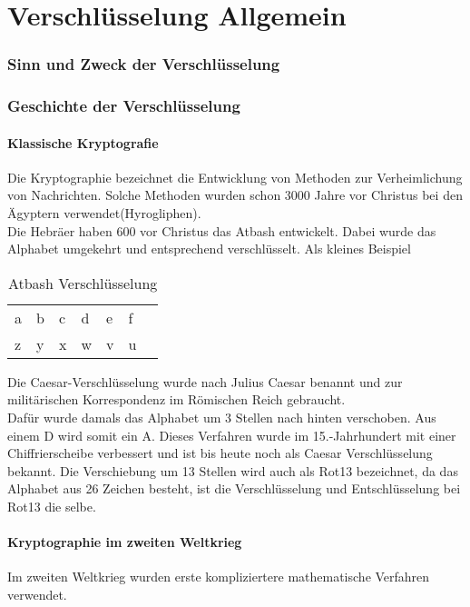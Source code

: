 \part{Verschlüsselung Allgemein}
\section{Sinn und Zweck der Verschlüsselung}


\section{Geschichte der Verschlüsselung}
\subsection{Klassische Kryptografie}
Die Kryptographie bezeichnet die Entwicklung von Methoden zur Verheimlichung von Nachrichten.
Solche Methoden wurden schon 3000 Jahre vor Christus bei den Ägyptern verwendet(Hyrogliphen). \\
Die Hebräer haben 600 vor Christus das Atbash entwickelt. Dabei wurde das Alphabet umgekehrt und entsprechend verschlüsselt.
Als kleines Beispiel

\begin{table}[ht]
\caption{Atbash Verschlüsselung}
\begin{center}
\begin{tabular}{|l|l|l|l|l|l|l|}
  a & b & c & d & e & f\\
  z & y & x & w & v & u\\
\end{tabular}
\end{center}
\end{table}


Die Caesar-Verschlüsselung wurde nach Julius Caesar benannt und zur militärischen Korrespondenz im Römischen Reich gebraucht.\\
Dafür wurde damals das Alphabet um 3 Stellen nach hinten verschoben. Aus einem D wird somit ein A. Dieses Verfahren wurde im 15.-Jahrhundert mit einer
Chiffrierscheibe verbessert und ist bis heute noch als Caesar Verschlüsselung bekannt. Die Verschiebung um 13 Stellen wird auch als Rot13 bezeichnet, 
da das Alphabet aus 26 Zeichen besteht, ist die Verschlüsselung und Entschlüsselung bei Rot13 die selbe.


\subsection{Kryptographie im zweiten Weltkrieg}
Im zweiten Weltkrieg wurden erste kompliziertere mathematische Verfahren verwendet. 

